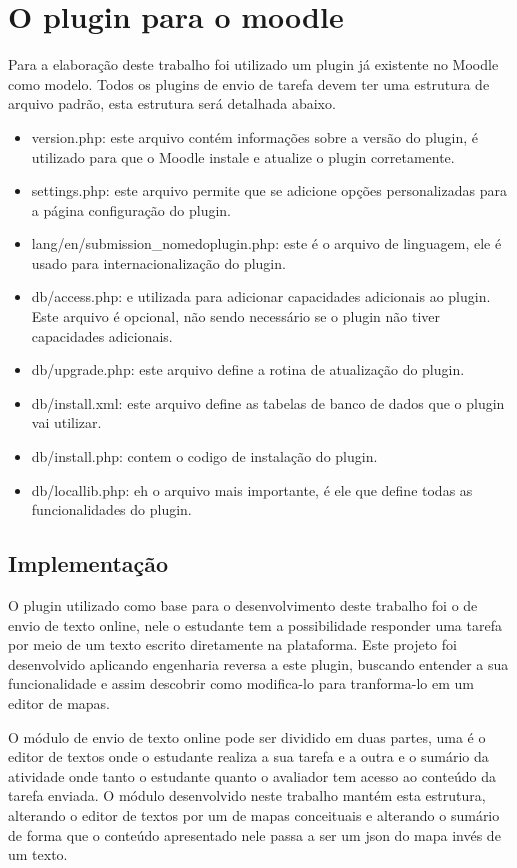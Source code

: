 \documentclass[
	12pt,				%
	openright,			%
	oneside,			%
	a4paper,			%
	english,			%
	french,				%
	spanish,			%
	brazil				%
	]{abntex2}
\begin{document}
\section{O plugin para o moodle} 
Para a elaboração deste trabalho foi utilizado um plugin já existente no Moodle como modelo. Todos os plugins de envio de tarefa devem ter uma estrutura de arquivo padrão, esta estrutura será detalhada abaixo.
\begin{itemize}
	\item version.php: este arquivo contém informações sobre a versão do plugin, é utilizado para que o Moodle instale e atualize o plugin corretamente.
	\item settings.php: este arquivo permite que se adicione opções personalizadas para a página configuração do plugin.
	\item lang/en/submission\_nomedoplugin.php:  este é o arquivo de linguagem, ele é usado para internacionalização do plugin.
	\item db/access.php: e utilizada para adicionar capacidades adicionais ao plugin. Este arquivo é opcional, não sendo necessário se o plugin não tiver capacidades adicionais.
	\item db/upgrade.php: este arquivo define a rotina de atualização do plugin. 
	\item db/install.xml: este arquivo define as tabelas de banco de dados que o plugin vai utilizar. 
	\item db/install.php: contem o codigo de instalação do plugin.
	\item db/locallib.php: eh o arquivo mais importante, é ele que define todas as funcionalidades do plugin.    
\end{itemize} 

\subsection{Implementação}
O plugin utilizado como base para o desenvolvimento deste trabalho foi o de envio de texto online, nele o estudante tem a possibilidade responder uma tarefa por meio de um texto escrito diretamente na plataforma. Este projeto foi desenvolvido aplicando engenharia reversa a este plugin, buscando entender a sua funcionalidade e assim descobrir como modifica-lo para tranforma-lo em um editor de mapas.

O módulo de envio de texto online pode ser dividido em duas partes, uma é o editor de textos onde o estudante realiza a sua tarefa e a outra e o sumário da atividade onde tanto o estudante quanto o avaliador tem acesso ao conteúdo da tarefa enviada. O módulo desenvolvido neste trabalho mantém esta estrutura, alterando o editor de textos por um de mapas conceituais e alterando o sumário de forma que o conteúdo apresentado nele passa a ser um json do mapa invés de um texto.
\end{document}

